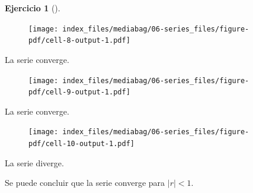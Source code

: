 \documentclass[
  a4paper,
]{scrreport}
\newenvironment{Shaded}{\begin{snugshade}}{\end{snugshade}}
\newcommand{\FloatTok}[1]{\textcolor[rgb]{0.68,0.00,0.00}{#1}}
\newcommand{\FunctionTok}[1]{\textcolor[rgb]{0.28,0.35,0.67}{#1}}
\newcommand{\NormalTok}[1]{\textcolor[rgb]{0.00,0.23,0.31}{#1}}
\newcommand{\OperatorTok}[1]{\textcolor[rgb]{0.37,0.37,0.37}{#1}}
\newcommand{\SpecialCharTok}[1]{\textcolor[rgb]{0.37,0.37,0.37}{#1}}
\newcommand{\StringTok}[1]{\textcolor[rgb]{0.13,0.47,0.30}{#1}}
\theoremstyle{definition}
\newtheorem{exercise}{Ejercicio}[chapter]
\theoremstyle{remark}
\begin{document}
\begin{exercise}[]
\begin{tcolorbox}
\begin{figure}[H]

{\centering \texttt{[image: index\_files/mediabag/06-series\_files/figure-pdf/cell-8-output-1.pdf]}

}

\end{figure}

La serie converge.

\begin{Shaded}
\end{Shaded}

\begin{figure}[H]

{\centering \texttt{[image: index\_files/mediabag/06-series\_files/figure-pdf/cell-9-output-1.pdf]}

}

\end{figure}

La serie converge.

\begin{Shaded}
\end{Shaded}

\begin{figure}[H]

{\centering \texttt{[image: index\_files/mediabag/06-series\_files/figure-pdf/cell-10-output-1.pdf]}

}

\end{figure}

La serie diverge.

Se puede concluir que la serie converge para \(|r|<1\).

\end{tcolorbox}

\end{exercise}
\end{document}
